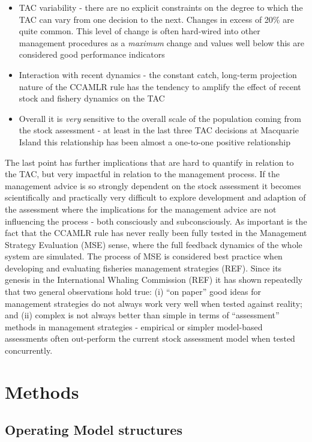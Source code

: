 \documentclass[12pt,a4paper,twoside,times,sky,standard]{csiroreport2017}
\begin{document}
\begin{itemize}
    \item TAC variability - there are no explicit constraints on the degree to which the TAC can vary from one decision to the next. Changes in excess of 20\% are quite common. This level of change is often hard-wired into other management procedures as a \emph{maximum} change and values well below this are considered good performance indicators
    \item Interaction with recent dynamics - the constant catch, long-term projection nature of the CCAMLR rule has the tendency to amplify the effect of recent stock and fishery dynamics on the TAC
    \item Overall it is \emph{very} sensitive to the overall scale of the population coming from the stock assessment - at least in the last three TAC decisions at Macquarie Island this relationship has been almost a one-to-one positive relationship
\end{itemize}

The last point has further implications that are hard to quantify in relation to the TAC, but very impactful in relation to the management process. If the management advice is so strongly dependent on the stock assessment it becomes scientifically and practically very difficult to explore development and adaption of the assessment where the implications for the management advice are not influencing the process - both consciously and subconsciously. As important is the fact that the CCAMLR rule has never really been fully tested in the Management Strategy Evaluation (MSE) sense, where the full feedback dynamics of the whole system are simulated. The process of MSE is considered best practice when developing and evaluating fisheries management strategies (REF). Since its genesis in the International Whaling Commission (REF) it has shown repeatedly that two general observations hold true: (i) ``on paper'' good ideas for management strategies do not always work very well when tested against reality; and (ii) complex is not always better than simple in terms of ``assessment'' methods in management strategies - empirical or simpler model-based assessments often out-perform the current stock assessment model when tested concurrently.

\section{Methods}

\subsection{Operating Model structures}
\end{document}
